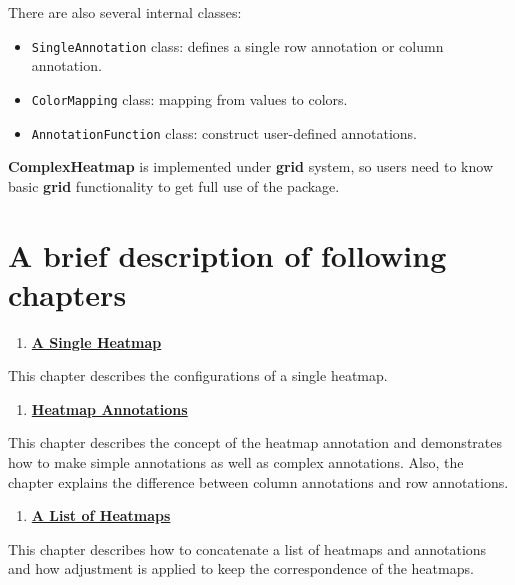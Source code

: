 \documentclass[]{book}
\providecommand{\tightlist}{%
  \setlength{\itemsep}{0pt}\setlength{\parskip}{0pt}}
\theoremstyle{definition}
\theoremstyle{definition}
\theoremstyle{definition}
\theoremstyle{remark}
\begin{document}
There are also several internal classes:

\begin{itemize}
\tightlist
\item
  \texttt{SingleAnnotation} class: defines a single row annotation or
  column annotation.
\item
  \texttt{ColorMapping} class: mapping from values to colors.
\item
  \texttt{AnnotationFunction} class: construct user-defined annotations.
\end{itemize}

\textbf{ComplexHeatmap} is implemented under \textbf{grid} system, so
users need to know basic \textbf{grid} functionality to get full use of
the package.

\section{A brief description of following
chapters}\label{a-brief-description-of-following-chapters}

\begin{enumerate}
\def\labelenumi{\arabic{enumi}.}
\tightlist
\item
  \href{a-single-heatmap.html}{\textbf{A Single Heatmap}}
\end{enumerate}

This chapter describes the configurations of a single heatmap.

\begin{enumerate}
\def\labelenumi{\arabic{enumi}.}
\setcounter{enumi}{1}
\tightlist
\item
  \protect\hyperlink{heatmap-annotations.html}{\textbf{Heatmap
  Annotations}}
\end{enumerate}

This chapter describes the concept of the heatmap annotation and
demonstrates how to make simple annotations as well as complex
annotations. Also, the chapter explains the difference between column
annotations and row annotations.

\begin{enumerate}
\def\labelenumi{\arabic{enumi}.}
\setcounter{enumi}{2}
\tightlist
\item
  \href{a-list-of-heatmaps.html}{\textbf{A List of Heatmaps}}
\end{enumerate}

This chapter describes how to concatenate a list of heatmaps and
annotations and how adjustment is applied to keep the correspondence of
the heatmaps.
\end{document}
